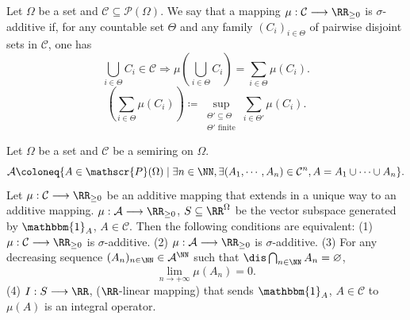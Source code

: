 \begin{definitionenv}
    Let $\Omega$ be a set and $\mathcal{C}\subseteq \mathscr{P}(\Omega)$. We say that a mapping $\mu:\mathcal{C}\longrightarrow \RR_{\ge 0}$ is $\sigma$-additive if, for any countable set $\Theta$ and any family $(C_i)_{i\in \Theta}$ of pairwise disjoint sets in $\mathcal{C}$, one has
    $$ \bigcup_{i\in \Theta}C_i\in \mathcal{C} \Rightarrow \mu\left(\bigcup_{i\in \Theta}C_i\right)=\sum_{i\in \Theta}\mu(C_i).$$
    $$\left(\sum_{i\in \Theta}\mu(C_i)\right)\coloneq \sup_{\substack{\Theta'\subseteq\Theta \\ \Theta' \text{ finite}}}\sum_{i\in \Theta'}\mu(C_i).$$
\end{definitionenv}

\begin{propositionenv}
    Let $\Omega$ be a set and $\mathcal{C}$ be a semiring on $\Omega$.
    $$ \mathcal{A}\coloneq \{ A\in \mathscr{P}(\Omega)\mid \exists n\in \NN, \exists (A_1,\cdots,A_n)\in \mathcal{C}^n, A=A_1\cup\cdots\cup A_n\}.$$
    Let $\mu:\mathcal{C}\longrightarrow \RR_{\ge 0}$ be an additive mapping that extends in a unique way to an additive mapping. $\mu: \mathcal{A}\longrightarrow \RR_{\ge 0}$, $S\subseteq \RR^{\Omega}$ be the vector subspace generated by $\mathbbm{1}_A$, $A\in \mathcal{C}$.
    Then the following conditions are equivalent:
    \newline
    (1) $\mu: \mathcal{C}\longrightarrow \RR_{\ge 0}$ is $\sigma$-additive.
    \newline
    (2) $\mu: \mathcal{A}\longrightarrow \RR_{\ge 0}$ is $\sigma$-additive.
    \newline
    (3) For any decreasing sequence $(A_n)_{n\in\NN}\in \mathcal{A}^{\NN}$ such that $\dis \bigcap_{n\in\NN}A_n=\varnothing$,
    $$ \lim_{n\rightarrow +\infty} \mu(A_n)=0.$$
    (4) $I:S\longrightarrow \RR$, ($\RR$-linear mapping) that sends $\mathbbm{1}_A$, $A\in \mathcal{C}$ to $\mu(A)$ is an integral operator.
\end{propositionenv}
